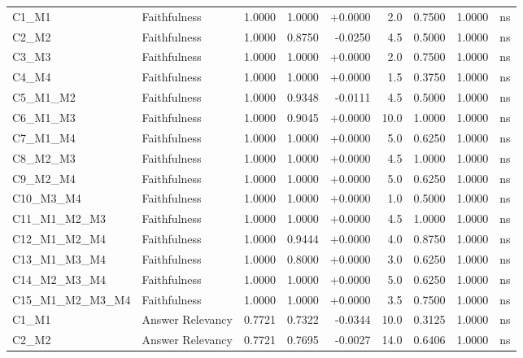 \begin{table}[p]
\begin{tabular*}{\textwidth}{@{\extracolsep{\fill}} l l r r r r r r c @{}}
\addlinespace
C1\_M1          & Faithfulness         & 1.0000 & 1.0000 & +0.0000 & 2.0 & 0.7500 & 1.0000 & ns \\
\addlinespace
C2\_M2          & Faithfulness         & 1.0000 & 0.8750 & -0.0250 & 4.5 & 0.5000 & 1.0000 & ns \\
\addlinespace
C3\_M3          & Faithfulness         & 1.0000 & 1.0000 & +0.0000 & 2.0 & 0.7500 & 1.0000 & ns \\
\addlinespace
C4\_M4          & Faithfulness         & 1.0000 & 1.0000 & +0.0000 & 1.5 & 0.3750 & 1.0000 & ns \\
\addlinespace
C5\_M1\_M2      & Faithfulness         & 1.0000 & 0.9348 & -0.0111 & 4.5 & 0.5000 & 1.0000 & ns \\
\addlinespace
C6\_M1\_M3      & Faithfulness         & 1.0000 & 0.9045 & +0.0000 & 10.0 & 1.0000 & 1.0000 & ns \\
\addlinespace
C7\_M1\_M4      & Faithfulness         & 1.0000 & 1.0000 & +0.0000 & 5.0 & 0.6250 & 1.0000 & ns \\
\addlinespace
C8\_M2\_M3      & Faithfulness         & 1.0000 & 1.0000 & +0.0000 & 4.5 & 1.0000 & 1.0000 & ns \\
\addlinespace
C9\_M2\_M4      & Faithfulness         & 1.0000 & 1.0000 & +0.0000 & 5.0 & 0.6250 & 1.0000 & ns \\
\addlinespace
C10\_M3\_M4     & Faithfulness         & 1.0000 & 1.0000 & +0.0000 & 1.0 & 0.5000 & 1.0000 & ns \\
\addlinespace
C11\_M1\_M2\_M3 & Faithfulness         & 1.0000 & 1.0000 & +0.0000 & 4.5 & 1.0000 & 1.0000 & ns \\
\addlinespace
C12\_M1\_M2\_M4 & Faithfulness         & 1.0000 & 0.9444 & +0.0000 & 4.0 & 0.8750 & 1.0000 & ns \\
\addlinespace
C13\_M1\_M3\_M4 & Faithfulness         & 1.0000 & 0.8000 & +0.0000 & 3.0 & 0.6250 & 1.0000 & ns \\
\addlinespace
C14\_M2\_M3\_M4 & Faithfulness         & 1.0000 & 1.0000 & +0.0000 & 5.0 & 0.6250 & 1.0000 & ns \\
\addlinespace
C15\_M1\_M2\_M3\_M4 & Faithfulness         & 1.0000 & 1.0000 & +0.0000 & 3.5 & 0.7500 & 1.0000 & ns \\
\addlinespace
C1\_M1          & Answer Relevancy     & 0.7721 & 0.7322 & -0.0344 & 10.0 & 0.3125 & 1.0000 & ns \\
\addlinespace
C2\_M2          & Answer Relevancy     & 0.7721 & 0.7695 & -0.0027 & 14.0 & 0.6406 & 1.0000 & ns \\

\end{tabular*}
\end{table}
